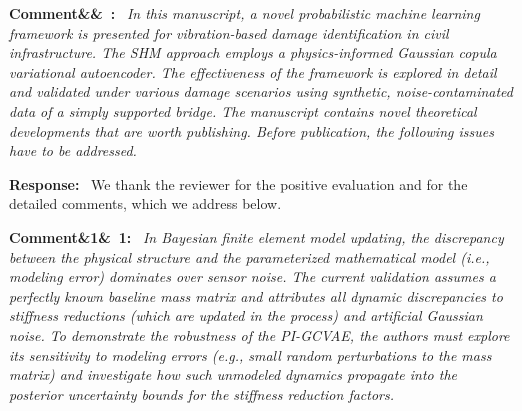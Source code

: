 \documentclass[11pt]{article}
\newenvironment{rcomment}[1]{\par\bigskip\noindent\textbf{Comment\ifx&#1&\else\ #1\fi:}\ \itshape}{\par}
\newenvironment{response}{\par\smallskip\noindent\color{resp}\textbf{Response:}\ }{\par}
\begin{document}
\begin{rcomment}{}
In this manuscript, a novel probabilistic machine learning framework is presented for vibration-based damage
identification in civil infrastructure. The SHM approach employs a physics-informed Gaussian copula variational
autoencoder. The effectiveness of the framework is explored in detail and validated under various damage scenarios
using synthetic, noise-contaminated data of a simply supported bridge. The manuscript contains novel theoretical
developments that are worth publishing. Before publication, the following issues have to be addressed.
\end{rcomment}

\begin{response}
We thank the reviewer for the positive evaluation and for the detailed comments, which we address below.
\end{response}

\begin{rcomment}{1}
In Bayesian finite element model updating, the discrepancy between the physical structure and the parameterized
mathematical model (i.e., modeling error) dominates over sensor noise. The current validation assumes a perfectly known
baseline mass matrix and attributes all dynamic discrepancies to stiffness reductions (which are updated in the process)
and artificial Gaussian noise. To demonstrate the robustness of the PI-GCVAE, the authors must explore its sensitivity
to modeling errors (e.g., small random perturbations to the mass matrix) and investigate how such unmodeled dynamics
propagate into the posterior uncertainty bounds for the stiffness reduction factors.
\end{rcomment}
\end{document}

